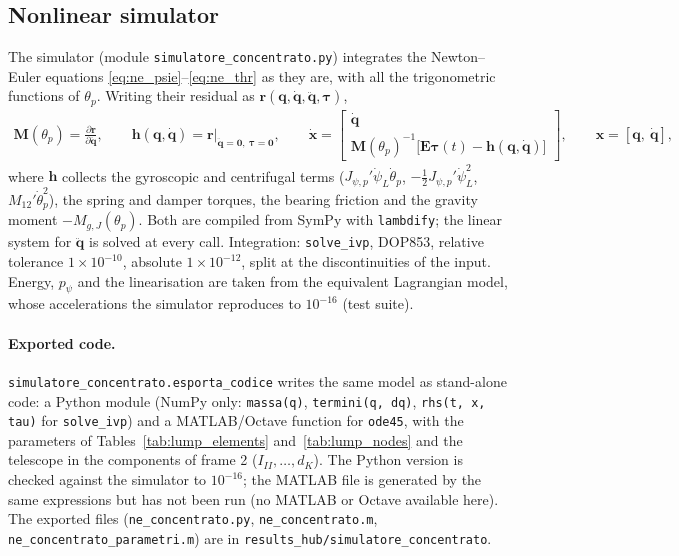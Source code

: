 \documentclass[10pt,a4paper]{article}
\numberwithin{equation}{section}
\begin{document}
\subsection{Nonlinear simulator}\label{subsec:lump_sim}
The simulator (module \texttt{simulatore\_concentrato.py}) integrates the Newton--Euler equations \eqref{eq:ne_psie}--\eqref{eq:ne_thr} as they are, with all the trigonometric functions of $\theta_p$. Writing their residual as $\mathbf r(\mathbf q, \dot{\mathbf q}, \ddot{\mathbf q}, \boldsymbol\tau)$,
\begin{gather}
\mathbf M(\theta_p) = \frac{\partial\mathbf r}{\partial\ddot{\mathbf q}},\qquad \mathbf h(\mathbf q, \dot{\mathbf q}) = \mathbf r\big|_{\ddot{\mathbf q} = \mathbf 0,\ \boldsymbol\tau = \mathbf 0},\qquad \dot{\mathbf x} = \begin{bmatrix}\dot{\mathbf q}\\ \mathbf M(\theta_p)^{-1}\bigl[\mathbf E\boldsymbol\tau(t) - \mathbf h(\mathbf q, \dot{\mathbf q})\bigr]\end{bmatrix},\qquad \mathbf x = [\mathbf q,\ \dot{\mathbf q}],
\end{gather}
where $\mathbf h$ collects the gyroscopic and centrifugal terms ($J_{\psi,p}'\dot\psi_L\dot\theta_p$, $-\tfrac12 J_{\psi,p}'\dot\psi_L^2$, $M_{12}'\dot\theta_p^2$), the spring and damper torques, the bearing friction and the gravity moment $-M_{g,J}(\theta_p)$. Both are compiled from SymPy with \texttt{lambdify}; the linear system for $\ddot{\mathbf q}$ is solved at every call. Integration: \texttt{solve\_ivp}, DOP853, relative tolerance $1\times10^{-10}$, absolute $1\times10^{-12}$, split at the discontinuities of the input. Energy, $p_\psi$ and the linearisation are taken from the equivalent Lagrangian model, whose accelerations the simulator reproduces to $10^{-16}$ (test suite).
\paragraph{Exported code.} \texttt{simulatore\_concentrato.esporta\_codice} writes the same model as stand-alone code: a Python module (NumPy only: \texttt{massa(q)}, \texttt{termini(q, dq)}, \texttt{rhs(t, x, tau)} for \texttt{solve\_ivp}) and a MATLAB/Octave function for \texttt{ode45}, with the parameters of Tables~\ref{tab:lump_elements} and~\ref{tab:lump_nodes} and the telescope in the components of frame 2 ($I_{II}, \dots, d_K$). The Python version is checked against the simulator to $10^{-16}$; the MATLAB file is generated by the same expressions but has not been run (no MATLAB or Octave available here). The exported files (\texttt{ne\_concentrato.py}, \texttt{ne\_concentrato.m}, \texttt{ne\_concentrato\_parametri.m}) are in \texttt{results\_hub/simulatore\_concentrato}.
\end{document}
